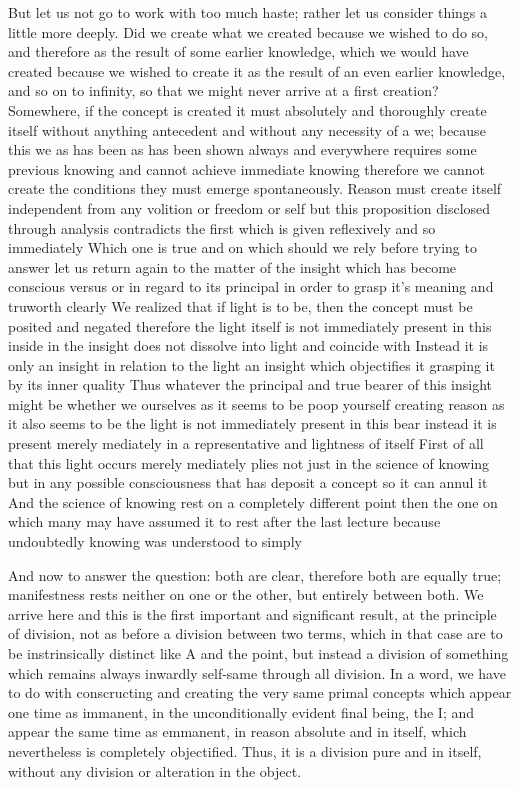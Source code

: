 \documentclass{article}
\begin{document}
But let us not go to work with too much haste;
rather let us consider things a little more deeply.
Did we create what we created because we wished to do so,
and therefore as the result of some earlier knowledge,
which we would have created because we wished to create it
as the result of an even earlier knowledge,
and so on to infinity, so that we might never arrive at a first creation?
Somewhere, if the concept is created it must absolutely and thoroughly create itself
without anything antecedent and without any necessity of a we;
because this we as has been as has been shown always and everywhere 
requires some previous knowing and cannot achieve immediate knowing
therefore we cannot create the conditions they must emerge spontaneously.
Reason must create itself independent from any volition or freedom or self
but this proposition disclosed through analysis contradicts the first 
which is given reflexively and so immediately
Which one is true and on which should we rely 
before trying to answer let us return again to the matter of
the insight which has become conscious versus or in regard to its principal
 in order to grasp it's meaning and truworth clearly
We realized that if light is to be, then the concept must be posited and negated
therefore the light itself is not immediately present in this inside
in the insight does not dissolve into light and coincide with
Instead it is only an insight in relation to the light
an insight which objectifies it grasping it by its inner quality
Thus whatever the principal and true bearer of this insight might be
whether we ourselves as it seems to be poop yourself creating reason
as it also seems to be 
the light is not immediately present in this bear
instead it is present merely mediately
in a representative and lightness of itself
First of all that this light occurs merely mediately plies 
not just in the science of knowing but in any possible consciousness
that has deposit a concept so it can annul it
And the science of knowing rest on a completely different point
then the one on which many may have assumed it to rest after the last lecture
because undoubtedly knowing was understood to simply

And now to answer the question:
both are clear, therefore both are equally true;
manifestness rests neither on one or the other,
but entirely between both.
We arrive here and this is the first important and significant result,
at the principle of division, not as before a division between two terms,
which in that case are to be instrinsically distinct like A and the point,
but instead a division of something which 
remains always inwardly self-same through all division.
In a word, we have to do with conscructing and creating
the very same primal concepts which appear one time
as immanent, in the unconditionally evident final being, the I;
and appear the same time as emmanent, in reason absolute and in itself,
which nevertheless is completely objectified.
Thus, it is a division pure and in itself,
without any division or alteration in the object.
\end{document}
